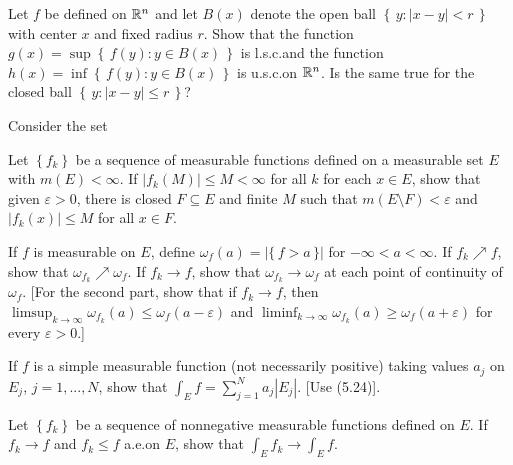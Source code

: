 \begin{problem}
  Let $f$ be defined on $\mathbb{R}^n$ and let $B(x)$ denote the open ball
  $\left\{\,y:|x-y|<r\,\right\}$ with center $x$ and fixed radius $r$. Show
  that the function $g(x)=\sup\left\{\,f(y):y\in B(x)\,\right\}$ is
  l.s.c.\@ and the function $h(x)=\inf\left\{\,f(y):y\in B(x)\,\right\}$ is
  u.s.c.\@ on $\mathbb{R}^n$. Is the same true for the closed ball
  $\left\{\,y:|x-y|\leq r\,\right\}$?
\end{problem}
\begin{solution}
  Consider the set
\end{solution}

\begin{problem}
  Let $\left\{f_k\right\}$ be a sequence of measurable functions defined on
  a measurable set $E$ with $m(E)<\infty$. If $|f_k(M)|\leq M<\infty$ for
  all $k$ for each $x\in E$, show that given $\varepsilon>0$, there is
  closed $F\subseteq E$ and finite $M$ such that
  $m(E\setminus F)<\varepsilon$ and $|f_k(x)|\leq M$ for all $x\in F$.
\end{problem}
\begin{solution}
\end{solution}

\begin{problem}
  If $f$ is measurable on $E$, define $\omega_f(a)=|\{\,f>a\,\}|$ for
  $-\infty<a<\infty$. If $f_k\nearrow f$, show that
  $\omega_{f_k}\nearrow\omega_f$. If $f_k\to f$, show that
  $\omega_{f_k}\to\omega_f$ at each point of continuity of $\omega_f$. [For
  the second part, show that if $f_k\to f$, then
  $\limsup_{k\to\infty}\omega_{f_k}(a)\leq\omega_f(a-\varepsilon)$ and
  $\liminf_{k\to\infty}\omega_{f_k}(a)\geq\omega_f(a+\varepsilon)$ for
  every $\varepsilon>0$.]
\end{problem}
\begin{solution}
\end{solution}

\begin{problem}
  If $f$ is a simple measurable function (not necessarily positive) taking
  values $a_j$ on $E_j$, $j=1,...,N$, show that
  $\int_E f=\sum_{j=1}^N a_j|E_j|$. [Use (5.24)].
\end{problem}
\begin{solution}
\end{solution}

\begin{problem}
Let $\left\{f_k\right\}$ be a sequence of nonnegative measurable functions
defined on $E$. If $f_k\to f$ and $f_k\leq f$ a.e.\@ on $E$, show that
$\int_E f_k\to\int_E f$.
\end{problem}
\begin{solution}
\end{solution}

